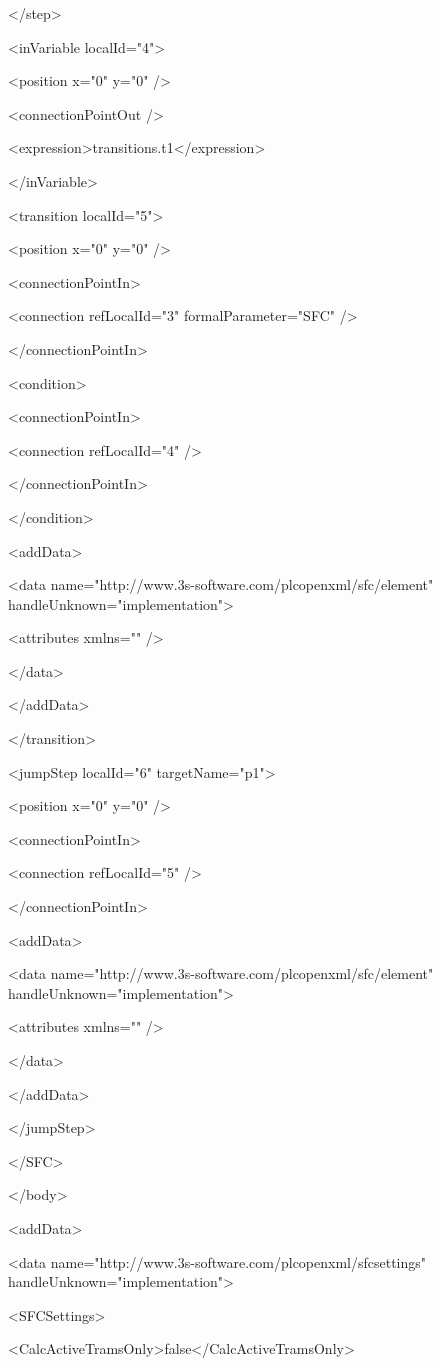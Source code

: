  </step>

 <inVariable localId="4">

  <position x="0" y="0" />

  <connectionPointOut />

  <expression>transitions.t1</expression>

 </inVariable>

 <transition localId="5">

  <position x="0" y="0" />

  <connectionPointIn>

   <connection refLocalId="3" formalParameter="SFC" />

  </connectionPointIn>

  <condition>

   <connectionPointIn>

    <connection refLocalId="4" />

   </connectionPointIn>

  </condition>

  <addData>

   <data name="http://www.3s-software.com/plcopenxml/sfc/element" handleUnknown="implementation">

    <attributes xmlns="" />

   </data>

  </addData>

 </transition>

 <jumpStep localId="6" targetName="p1">

  <position x="0" y="0" />

  <connectionPointIn>

   <connection refLocalId="5" />

  </connectionPointIn>

  <addData>

   <data name="http://www.3s-software.com/plcopenxml/sfc/element" handleUnknown="implementation">

    <attributes xmlns="" />

   </data>

  </addData>

 </jumpStep>

</SFC>

</body>

<addData>

<data name="http://www.3s-software.com/plcopenxml/sfcsettings" handleUnknown="implementation">

 <SFCSettings>

  <CalcActiveTramsOnly>false</CalcActiveTramsOnly>

